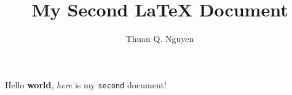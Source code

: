 \documentclass{article}
\begin{document}
\title{My Second \LaTeX{} Document}
\author{Thuan Q. Nguyen}
\maketitle

Hello \textbf{world}, \textit{here} is my \texttt{second} document! %
\end{document}
